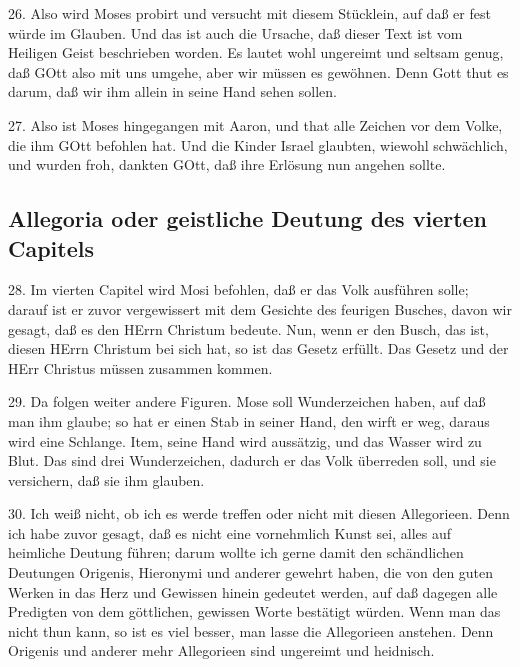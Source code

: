 26. Also wird Moses probirt und versucht mit diesem Stücklein, auf daß er fest würde im Glauben. Und das ist auch die Ursache, daß dieser Text ist vom Heiligen Geist beschrieben worden. Es lautet wohl ungereimt und seltsam genug, daß GOtt also mit uns umgehe, aber wir müssen es gewöhnen. Denn Gott thut es darum, daß wir ihm allein in seine Hand sehen sollen.

27. Also ist Moses hingegangen mit Aaron, und that alle Zeichen vor dem Volke, die ihm GOtt befohlen hat. Und die Kinder Israel glaubten, wiewohl schwächlich, und wurden froh, dankten GOtt, daß ihre Erlösung nun angehen sollte.

\subsection{Allegoria oder geistliche Deutung des vierten Capitels}

28. Im vierten Capitel wird Mosi befohlen, daß er das Volk ausführen solle; darauf ist er zuvor vergewissert mit dem Gesichte des feurigen Busches, davon wir gesagt, daß es den HErrn Christum bedeute. Nun, wenn er den Busch, das ist, diesen HErrn Christum bei sich hat, so ist das Gesetz erfüllt. Das Gesetz und der HErr Christus müssen zusammen kommen.

29. Da folgen weiter andere Figuren. Mose soll Wunderzeichen haben, auf daß man ihm glaube; so hat er einen Stab in seiner Hand, den wirft er weg, daraus wird eine Schlange. Item, seine Hand wird aussätzig, und das Wasser wird zu Blut. Das sind drei Wunderzeichen, dadurch er das Volk überreden soll, und sie versichern, daß sie ihm glauben.

30. Ich weiß nicht, ob ich es werde treffen oder nicht mit diesen Allegorieen. Denn ich habe zuvor gesagt, daß es nicht eine vornehmlich Kunst sei, alles auf heimliche Deutung führen; darum wollte ich gerne damit den schändlichen Deutungen Origenis, Hieronymi und anderer gewehrt haben, die von den guten Werken in das Herz und Gewissen hinein gedeutet werden, auf daß dagegen alle Predigten von dem göttlichen, gewissen Worte bestätigt würden. Wenn man das nicht thun kann, so ist es viel besser, man lasse die Allegorieen anstehen. Denn Origenis und anderer mehr Allegorieen sind ungereimt und heidnisch.

